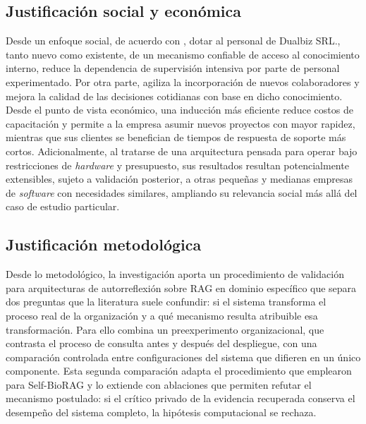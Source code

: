 \subsection*{Justificación social y económica}

Desde un enfoque social, de acuerdo con  \textcite{Achury2016induccion}, dotar al personal de Dualbiz SRL., tanto nuevo como existente, de un mecanismo confiable de acceso al conocimiento interno, reduce la dependencia de supervisión intensiva por parte de personal experimentado. Por otra parte, agiliza la incorporación de nuevos colaboradores y mejora la calidad de las decisiones cotidianas con base en dicho conocimiento. Desde el punto de vista económico, una inducción más eficiente reduce costos de capacitación y permite a la empresa asumir nuevos proyectos con mayor rapidez, mientras que sus clientes se benefician de tiempos de respuesta de soporte más cortos. Adicionalmente, al tratarse de una arquitectura pensada para operar bajo restricciones de \textit{hardware} y presupuesto, sus resultados resultan potencialmente extensibles, sujeto a validación posterior, a otras pequeñas y medianas empresas de \textit{software} con necesidades similares, ampliando su relevancia social más allá del caso de estudio particular.

\subsection*{Justificación metodológica}

Desde lo metodológico, la investigación aporta un procedimiento de validación para arquitecturas de autorreflexión sobre RAG en dominio específico que separa dos preguntas que la literatura suele confundir: si el sistema transforma el proceso real de la organización y a qué mecanismo resulta atribuible esa transformación. Para ello combina un preexperimento organizacional, que contrasta el proceso de consulta antes y después del despliegue, con una comparación controlada entre configuraciones del sistema que difieren en un único componente. Esta segunda comparación adapta el procedimiento que \textcite{jeong_improving_2024} emplearon para Self-BioRAG y lo extiende con ablaciones que permiten refutar el mecanismo postulado: si el crítico privado de la evidencia recuperada conserva el desempeño del sistema completo, la hipótesis computacional se rechaza.

